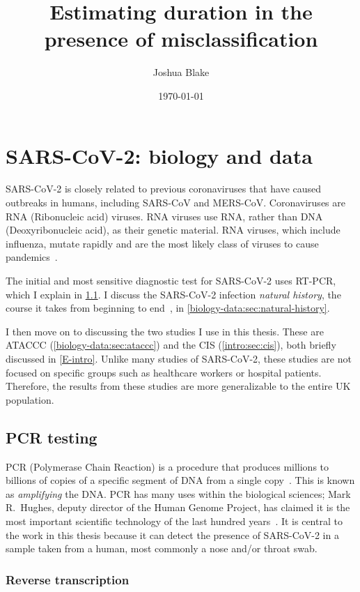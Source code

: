 \documentclass[thesis.tex]{subfiles}
\title{Estimating duration in the presence of misclassification}
\author{Joshua Blake}
\date{\today}
\begin{document}
\ifSubfilesClassLoaded{
  \setcounter{chapter}{1}
}

\chapter{SARS-CoV-2: biology and data} \label{biology-data}

SARS-CoV-2 is closely related to previous coronaviruses that have caused outbreaks in humans, including SARS-CoV and MERS-CoV.
Coronaviruses are RNA (Ribonucleic acid) viruses.
RNA viruses use RNA, rather than DNA (Deoxyribonucleic acid), as their genetic material.
RNA viruses, which include influenza, mutate rapidly and are the most likely class of viruses to cause pandemics~\autocite{woolhouseRNA}.

The initial and most sensitive diagnostic test for SARS-CoV-2 uses RT-PCR, which I explain in \cref{biology-data:sec:PCR}.
I discuss the SARS-CoV-2 infection \emph{natural history}, the course it takes from beginning to end~\autocite[193]{portaEpiDictionary}, in \cref{biology-data:sec:natural-history}.

I then move on to discussing the two studies I use in this thesis.
These are ATACCC (\cref{biology-data:sec:ataccc}) and the CIS (\cref{intro:sec:cis}), both briefly discussed in \cref{E-intro}.
Unlike many studies of SARS-CoV-2, these studies are not focused on specific groups such as healthcare workers or hospital patients.
Therefore, the results from these studies are more generalizable to the entire UK population.

\section{PCR testing} \label{biology-data:sec:PCR}

PCR (Polymerase Chain Reaction) is a procedure that produces millions to billions of copies of a specific segment of DNA  from a single copy~\autocite{smithPCR,garibyanPCR}.
This is known as \emph{amplifying} the DNA.
PCR has many uses within the biological sciences; Mark R.\ Hughes, deputy director of the Human Genome Project, has claimed it is the most important scientific technology of the last hundred years~\autocite{powledgePCR}.
It is central to the work in this thesis because it can detect the presence of SARS-CoV-2 in a sample taken from a human, most commonly a nose and/or throat swab.

\subsection{Reverse transcription}
\end{document}
